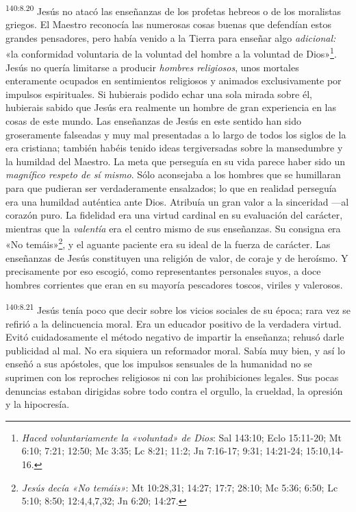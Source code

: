 \par 
\textsuperscript{140:8.20} Jesús no atacó las enseñanzas de los profetas hebreos o de los moralistas griegos. El Maestro reconocía las numerosas cosas buenas que defendían estos grandes pensadores, pero había venido a la Tierra para enseñar algo \textit{adicional:} «la conformidad voluntaria de la voluntad del hombre a la voluntad de Dios»\footnote{\textit{Haced voluntariamente la «voluntad» de Dios}: Sal 143:10; Eclo 15:11-20; Mt 6:10; 7:21; 12:50; Mc 3:35; Lc 8:21; 11:2; Jn 7:16-17; 9:31; 14:21-24; 15:10,14-16.}. Jesús no quería limitarse a producir \textit{hombres religiosos}, unos mortales enteramente ocupados en sentimientos religiosos y animados exclusivamente por impulsos espirituales. Si hubierais podido echar una sola mirada sobre él, hubierais sabido que Jesús era realmente un hombre de gran experiencia en las cosas de este mundo. Las enseñanzas de Jesús en este sentido han sido groseramente falseadas y muy mal presentadas a lo largo de todos los siglos de la era cristiana; también habéis tenido ideas tergiversadas sobre la mansedumbre y la humildad del Maestro. La meta que perseguía en su vida parece haber sido un \textit{magnífico respeto de sí mismo}. Sólo aconsejaba a los hombres que se humillaran para que pudieran ser verdaderamente ensalzados; lo que en realidad perseguía era una humildad auténtica ante Dios. Atribuía un gran valor a la sinceridad ---al corazón puro. La fidelidad era una virtud cardinal en su evaluación del carácter, mientras que la \textit{valentía} era el centro mismo de sus enseñanzas. Su consigna era «No temáis»\footnote{\textit{Jesús decía «No temáis»}: Mt 10:28,31; 14:27; 17:7; 28:10; Mc 5:36; 6:50; Lc 5:10; 8:50; 12:4,4,7,32; Jn 6:20; 14:27.}, y el aguante paciente era su ideal de la fuerza de carácter. Las enseñanzas de Jesús constituyen una religión de valor, de coraje y de heroísmo. Y precisamente por eso escogió, como representantes personales suyos, a doce hombres corrientes que eran en su mayoría pescadores toscos, viriles y valerosos.

\par 
\textsuperscript{140:8.21} Jesús tenía poco que decir sobre los vicios sociales de su época; rara vez se refirió a la delincuencia moral. Era un educador positivo de la verdadera virtud. Evitó cuidadosamente el método negativo de impartir la enseñanza; rehusó darle publicidad al mal. No era siquiera un reformador moral. Sabía muy bien, y así lo enseñó a sus apóstoles, que los impulsos sensuales de la humanidad no se suprimen con los reproches religiosos ni con las prohibiciones legales. Sus pocas denuncias estaban dirigidas sobre todo contra el orgullo, la crueldad, la opresión y la hipocresía.

